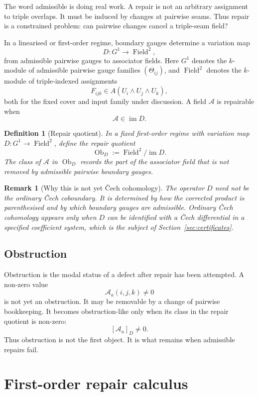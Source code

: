 \documentclass[11pt]{article}
\newtheorem{definition}[theorem]{Definition}
\newtheorem{remark}[theorem]{Remark}
\newcommand{\im}{\operatorname{im}}
\newcommand{\Field}{\operatorname{Field}}
\newcommand{\Ob}{\operatorname{Ob}}
\begin{document}
The word admissible is doing real work. A repair is not an arbitrary assignment to triple overlaps. It must be induced by changes at pairwise seams. Thus repair is a constrained problem: can pairwise changes cancel a triple-seam field?

In a linearised or first-order regime, boundary gauges determine a variation map
\[
D:G^1\to \Field^2,
\]
from admissible pairwise gauges to associator fields. Here \(G^1\) denotes the \(k\)-module of admissible pairwise gauge families \((\Theta_{ij})\), and \(\Field^2\) denotes the \(k\)-module of triple-indexed assignments
\[
F_{ijk}\in A(U_i\wedge U_j\wedge U_k),
\]
both for the fixed cover and input family under discussion. A field \(\mathcal A\) is repairable when
\[
\mathcal A\in \im D.
\]

\begin{definition}[Repair quotient]
In a fixed first-order regime with variation map \(D:G^1\to \Field^2\), define the repair quotient
\[
\Ob_D:=\Field^2/\im D.
\]
The class of \(\mathcal A\) in \(\Ob_D\) records the part of the associator field that is not removed by admissible pairwise boundary gauges.
\end{definition}

\begin{remark}[Why this is not yet \v{C}ech cohomology]
The operator \(D\) need not be the ordinary \v{C}ech coboundary. It is determined by how the corrected product is parenthesised and by which boundary gauges are admissible. Ordinary \v{C}ech cohomology appears only when \(D\) can be identified with a \v{C}ech differential in a specified coefficient system, which is the subject of Section~\ref{sec:certificates}.
\end{remark}

\subsection{Obstruction}

Obstruction is the modal status of a defect after repair has been attempted. A non-zero value
\[
\mathcal A_a(i,j,k)\neq 0
\]
is not yet an obstruction. It may be removable by a change of pairwise bookkeeping. It becomes obstruction-like only when its class in the repair quotient is non-zero:
\[
[\mathcal A_a]_D\neq 0.
\]
Thus obstruction is not the first object. It is what remains when admissible repairs fail.

\section{First-order repair calculus}
\label{sec:first-order}
\end{document}

